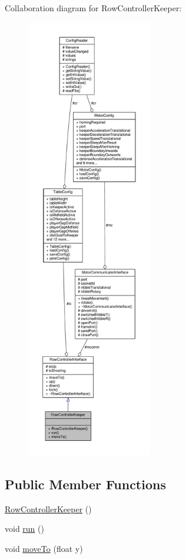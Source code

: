 Collaboration diagram for Row\+Controller\+Keeper\+:\nopagebreak
\begin{figure}[H]
\begin{center}
\leavevmode
\includegraphics[height=550pt]{class_row_controller_keeper__coll__graph}
\end{center}
\end{figure}
\subsection*{Public Member Functions}
\begin{DoxyCompactItemize}
\item 
\hyperlink{class_row_controller_keeper_afd44d094566b6c0654d03823d25ca7f0}{Row\+Controller\+Keeper} ()
\item 
void \hyperlink{class_row_controller_keeper_acfa0da8398fac5dfeda1f75cee7f755a}{run} ()
\item 
void \hyperlink{class_row_controller_keeper_adeddc7c24785ee86461635c13fab70c0}{move\+To} (float y)
\end{DoxyCompactItemize}

